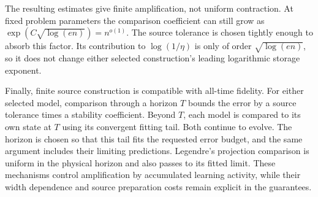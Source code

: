 The resulting estimates give finite amplification, not uniform contraction.
At fixed problem parameters the comparison coefficient can still grow as
$\exp(C\sqrt{\log(en)})=n^{o(1)}$. The source tolerance is chosen tightly
enough to absorb this factor. Its contribution to $\log(1/\eta)$ is only
of order $\sqrt{\log(en)}$, so it does not change either selected
construction's leading logarithmic storage exponent.

Finally, finite source construction is compatible with all-time fidelity.
For either selected model, comparison through a horizon $T$ bounds the
error by a source tolerance times a stability coefficient. Beyond $T$,
each model is compared to its own state at $T$ using its convergent fitting
tail. Both continue to evolve. The horizon is chosen so that this tail
fits the requested error budget, and the same argument includes their
limiting predictions. Legendre's projection comparison is uniform in the
physical horizon and also passes to its fitted limit. These mechanisms
control amplification by accumulated learning activity, while their width
dependence and source preparation costs remain explicit in the guarantees.
